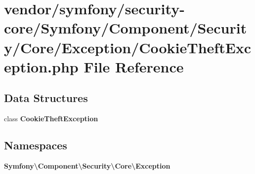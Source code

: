 \section{vendor/symfony/security-\/core/\+Symfony/\+Component/\+Security/\+Core/\+Exception/\+Cookie\+Theft\+Exception.php File Reference}
\label{_cookie_theft_exception_8php}
\subsection*{Data Structures}
\begin{DoxyCompactItemize}
\item 
class {\bf Cookie\+Theft\+Exception}
\end{DoxyCompactItemize}
\subsection*{Namespaces}
\begin{DoxyCompactItemize}
\item 
 {\bf Symfony\textbackslash{}\+Component\textbackslash{}\+Security\textbackslash{}\+Core\textbackslash{}\+Exception}
\end{DoxyCompactItemize}
